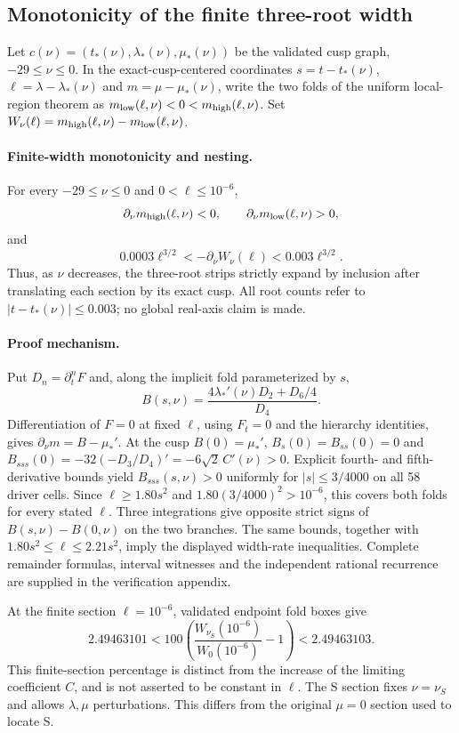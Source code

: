 
\subsection{Monotonicity of the finite three-root width}

Let $c(\nu)=(t_*(\nu),\lambda_*(\nu),\mu_*(\nu))$ be the
validated cusp graph, $-29\leq\nu\leq0$. In the exact-cusp-centered
coordinates $s=t-t_*(\nu)$, $\ell=\lambda-\lambda_*(\nu)$ and
$m=\mu-\mu_*(\nu)$, write the two folds of the uniform local-region
theorem as $m_{\rm low}(\ell,\nu)<0<m_{\rm high}(\ell,\nu)$.
Set $W_\nu(\ell)=m_{\rm high}(\ell,\nu)-m_{\rm low}(\ell,\nu)$.

\paragraph{Finite-width monotonicity and nesting.}
For every $-29\leq\nu\leq0$ and $0<\ell\leq10^{-6}$,
\[
 \partial_\nu m_{\rm high}(\ell,\nu)<0,
 \qquad \partial_\nu m_{\rm low}(\ell,\nu)>0,
\]
and
\[
 0.0003\ell^{3/2}<-\partial_\nu W_\nu(\ell)
 <0.003\ell^{3/2}.
\]
Thus, as $\nu$ decreases, the three-root strips strictly expand by
inclusion after translating each section by its exact cusp. All root
counts refer to $|t-t_*(\nu)|\leq0.003$; no global real-axis claim is made.

\paragraph{Proof mechanism.}
Put $D_n=\partial_t^nF$ and, along the implicit fold parameterized by $s$,
\[
 B(s,\nu)=\frac{4\lambda_*'(\nu)D_2+D_6/4}{D_4}.
\]
Differentiation of $F=0$ at fixed $\ell$, using $F_t=0$ and the
hierarchy identities, gives $\partial_\nu m=B-\mu_*'$.
At the cusp $B(0)=\mu_*'$, $B_s(0)=B_{ss}(0)=0$ and
$B_{sss}(0)=-32(-D_3/D_4)'=-6\sqrt2\,C'(\nu)>0$.
Explicit fourth- and fifth-derivative bounds yield
$B_{sss}(s,\nu)>0$ uniformly for $|s|\leq3/4000$ on all 58
driver cells. Since $\ell\geq1.80s^2$ and
$1.80(3/4000)^2>10^{-6}$, this covers both folds for every stated
$\ell$. Three integrations give opposite strict signs of
$B(s,\nu)-B(0,\nu)$ on the two branches. The same bounds, together
with $1.80s^2\leq\ell\leq2.21s^2$, imply the displayed width-rate
inequalities. Complete remainder formulas, interval witnesses and the
independent rational recurrence are supplied in the verification appendix.

At the finite section $\ell=10^{-6}$, validated endpoint fold boxes give
\[
 2.49463101<100\left(\frac{W_{\nu_S}(10^{-6})}
 {W_0(10^{-6})}-1\right)<2.49463103.
\]
This finite-section percentage is distinct from the increase of the
limiting coefficient $C$, and is not asserted to be constant in $\ell$.
The S section fixes $\nu=\nu_S$ and allows $\lambda,\mu$ perturbations.
This differs from the original $\mu=0$ section used to locate S.
